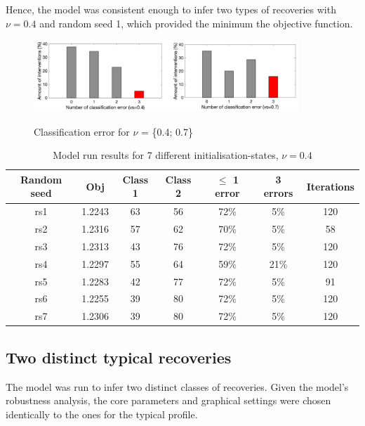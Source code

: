 Hence, the model was consistent enough to infer two types of recoveries with $\nu=0.4$ and random seed 1, which provided the minimum the objective function.

\begin{figure}[!h]
    \caption{Classification error for $\nu$ = \{0.4; 0.7\}}
    \centering
    \includegraphics[width=100mm]{images/nl2classerror.png}
    \label{fig:nl2classerror}
\end{figure}

\begin{table}[!h]
    \centering
    \begin{tabular}{c|c|c|c|c|c|c}
        \hline
         \textbf{Random seed}& \textbf{Obj} & \textbf{Class 1} & \textbf{Class 2} & \textbf{ $\leq$ 1 error} & \textbf{3 errors} & \textbf{Iterations}\\
         \hline
         rs1 & 1.2243 & 63 & 56 & 72\% & 5\% & 120 \\
         rs2 & 1.2316 & 57 & 62 & 70\% & 5\% & 58 \\
         rs3 & 1.2313 & 43 & 76 & 72\% & 5\% & 120 \\
         rs4 & 1.2297 & 55 & 64 & 59\% & 21\% & 120 \\
         rs5 & 1.2283 & 42 & 77 & 72\% & 5\% & 91 \\
         rs6 & 1.2255 & 39 & 80 & 72\% & 5\% & 120 \\
         rs7 & 1.2306 & 39 & 80 & 72\% & 5\% & 120 \\
         \hline
    \end{tabular}
    \caption{Model run results for 7 different initialisation-states, $\nu=0.4$}
    \label{tab:nl2vs}
\end{table}



\subsection{Two distinct typical recoveries}
The model was run to infer two distinct classes of recoveries. Given the model's robustness analysis, the core parameters and graphical settings were chosen identically to the ones for the typical profile.

